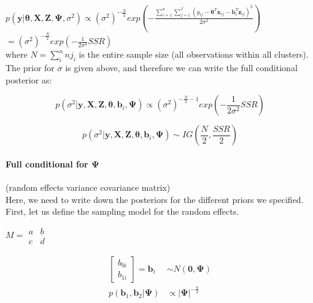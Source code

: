\documentclass[a4paper]{article}
\begin{document}
$p(\bm{y}|\bm{\theta}, \bm{X}, \bm{Z}, \bm{\Psi}, \sigma^2) \propto (\sigma^{2})^{-\frac{N}{2}}exp(-\frac{\sum_{i = 1}^{n}\sum_{j = 1}^{J}( y_{ij}-\bm{\theta}^{T}\bm{x}_{ij} - \bm{b}_{i}^{T}\bm{z}_{ij})^2 }{2\sigma^2})$
$=(\sigma^{2})^{-\frac{N}{2}}exp(-\frac{1}{2\sigma^2}SSR)$ \\

where $N = \sum_{i}^{n}nj_{i}$ is the entire sample size (all observations within all clusters).\\

The prior for $\sigma$ is given above, and therefore we can write the full conditional posterior as:

\begin{equation}
	p(\sigma^2|\bm{y}, \bm{X}, \bm{Z}, \bm{\theta}, \bm{b}_{i}, \bm{\Psi}) \propto (\sigma^{2})^{-\frac{N}{2}-1}exp(-\frac{1}{2\sigma^2}SSR)
\end{equation}

\begin{equation}
	p(\sigma^2|\bm{y}, \bm{X}, \bm{Z}, \bm{\theta}, \bm{b}_{i}, \bm{\Psi}) \sim IG(\frac{N}{2}, \frac{SSR}{2})
\end{equation}



\paragraph{Full conditional for $\bm{\Psi}$}(random effects variance covariance matrix)\\

Here, we need to write down the posteriors for the different priors we specified. First, let us define the sampling model for the random effects.

$M = \begin{smallmatrix} a&b\\ c&d \end{smallmatrix}$

\begin{equation}
\begin{split}
\begin{bmatrix} 
  b_{0i}\\ 
  b_{1i}
\end{bmatrix} 
= \bm{b}_{i}& \sim N(\bm{0}, \bm{\Psi}) \\
p(\bm{b}_{1}, \bm{b}_{2}| \bm{\Psi})& \propto |\bm{\Psi}|^{-\frac{n}{2}}
\end{split}
\end{equation}
\end{document}
